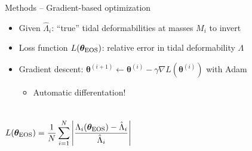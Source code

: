 \documentclass[usenames,dvipsnames,t]{beamer}
\newcommand{\thetaeos}{\boldsymbol{\theta}_{\rm{EOS}}}
\newcommand{\boldtheta}{\boldsymbol{\theta}}
\begin{document}
\begin{frame}{Methods -- Gradient-based optimization}

  \def\x{2mm}

  \begin{itemize}


    \item Given $\hat{\Lambda}_i$: ``true'' tidal deformabilities at masses $M_i$ to invert

    \vspace{\x}
    
    \item Loss function $L(\thetaeos)$: relative error in tidal deformability $\Lambda$
    
    \vspace{\x}

    \item Gradient descent: $\boldtheta^{(i+1)} \leftarrow \boldtheta^{(i)} - \gamma \nabla L(\boldtheta^{(i)})$ with Adam
    
    \begin{itemize}
      \item Automatic differentation! %
    \end{itemize}

  \end{itemize}

  \vspace{-3mm}

  \begin{columns}


    \small
    \begin{equation*}
      L(\thetaeos) = \frac1N \sum_{i=1}^N \left| \frac{\Lambda_i(\thetaeos) - \hat{\Lambda}_i}{\hat{\Lambda}_i} \right|
    \end{equation*}

    \normalsize



\end{columns}
\end{frame}
\end{document}
